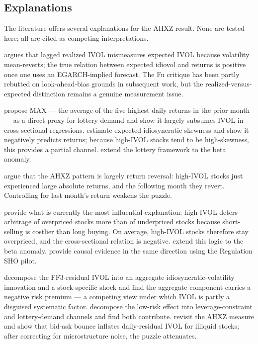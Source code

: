 \documentclass[12pt]{article}
\newcommand{\1}[1]{\mathds{1}\left[#1\right]}
\begin{document}
\subsection{Explanations}

The literature offers several explanations for the AHXZ result. None are tested
here; all are cited as competing interpretations.

\citet{fu2009idiosyncratic} argues that lagged realized IVOL mismeasures
expected IVOL because volatility mean-reverts; the true relation between
expected idiovol and returns is positive once one uses an EGARCH-implied
forecast. The Fu critique has been partly rebutted on look-ahead-bias grounds
in subsequent work, but the realized-versus-expected distinction remains a
genuine measurement issue.

\citet{bali2011maxing} propose MAX --- the average of the five highest daily
returns in the prior month --- as a direct proxy for lottery demand and show
it largely subsumes IVOL in cross-sectional regressions.
\citet{boyer2010expected} estimate expected idiosyncratic skewness and show it
negatively predicts returns; because high-IVOL stocks tend to be
high-skewness, this provides a partial channel.
\citet{bali2017lottery} extend the lottery framework to the beta anomaly.

\citet{huang2010return} argue that the AHXZ pattern is largely return reversal:
high-IVOL stocks just experienced large absolute returns, and the following
month they revert. Controlling for last month's return weakens the puzzle.

\citet{stambaugh2015arbitrage} provide what is currently the most influential
explanation: high IVOL deters arbitrage of overpriced stocks more than of
underpriced stocks because short-selling is costlier than long buying. On
average, high-IVOL stocks therefore stay overpriced, and the cross-sectional
relation is negative. \citet{liu2018absolving} extend this logic to the beta
anomaly. \citet{chu2020idiosyncratic} provide causal evidence in the same
direction using the Regulation SHO pilot.

\citet{chen2012does} decompose the FF3-residual IVOL into an aggregate
idiosyncratic-volatility innovation and a stock-specific shock and find the
aggregate component carries a negative risk premium --- a competing view
under which IVOL is partly a disguised systematic factor.
\citet{asness2020betting} decompose the low-risk effect into leverage-constraint
and lottery-demand channels and find both contribute. \citet{han2011investor}
revisit the AHXZ measure and show that bid-ask bounce inflates daily-residual
IVOL for illiquid stocks; after correcting for microstructure noise, the
puzzle attenuates.
\end{document}
